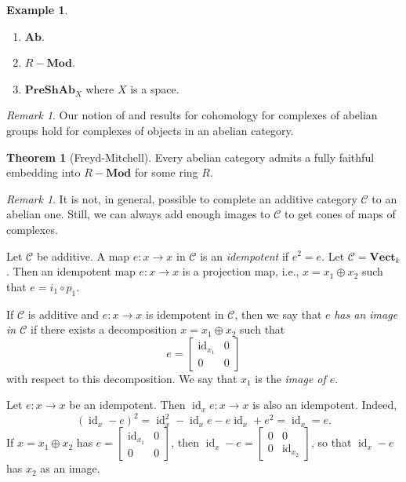 \documentclass[10pt,letterpaper,cm]{nupset}
\theoremstyle{definition}
\newtheorem{exmp}[definition]{Example}
\theoremstyle{theorem}
\newtheorem{theorem}[definition]{Theorem}
\theoremstyle{remark}
\newtheorem{remark}[definition]{Remark}
\newcommand{\1}{\mathbf{1}}
\renewcommand{\c}{\mathscr{C}}
\newcommand{\0}{\vec 0}
\DeclareMathOperator{\id}{id}
\begin{document}
\begin{exmp} $ $
\begin{enumerate}
\item $\mathbf{Ab}$.
\item $R{-}\mathbf{Mod}$.
\item $\mathbf{PreShAb}_X$ where $X$ is a space.
\end{enumerate}
\end{exmp}

\begin{remark}
Our notion of and results for cohomology for complexes of abelian groups hold for complexes of objects in an abelian category.
\end{remark}

\begin{theorem}[Freyd-Mitchell]
Every abelian  category admits a fully faithful embedding into $R{-}\mathbf{Mod}$ for some ring $R$.
\end{theorem}

\begin{remark}
It is not, in general, possible to complete an additive category $\c$ to an abelian one. Still, we can always add enough images to $\c$ to get cones of maps of complexes.
\end{remark}

\smallskip

Let $\c$ be additive. A map $e: x\to x$ in $\c$ is an \textit{idempotent} if $e^2=e$. Let $\c= \mathbf{Vect}_k$. Then an idempotent map $e : x \to x$ is a projection map, i.e., $x = x_1 \oplus x_2$ such that $e = i_1 \circ p_1$.



If $\c$ is additive and $e: x \to x$ is idempotent in $\c$, then we say that $e$ \textit{has an image in $\c$} if there exists a decomposition $x = x_1 \oplus x_2$ such that $$e = \begin{bmatrix} \id_{x_1} & 0 \\ 0 & 0   \end{bmatrix}    $$ with respect to this decomposition. We say that $x_1$ is the \textit{image of $e$}.



Let $e : x \to x$ be an idempotent. Then $\id_{x}{e} : x \to x$ is also an idempotent. Indeed, $$ (\id_x - e)^2 = \id_x^2 - \id_x{e} - e {\id_x} + e^2 = \id_x = e   .$$ If $x = x_1 \oplus x_2$ has $e = \begin{bmatrix}  \id_{x_1} & 0 \\ 0 & 0 \end{bmatrix}$, then $\id_x - e = \begin{bmatrix}  0 & 0 \\ 0 & \id_{x_2} \end{bmatrix}$, so that $\id_x - e$ has $x_2$ as an image.
\end{document}

